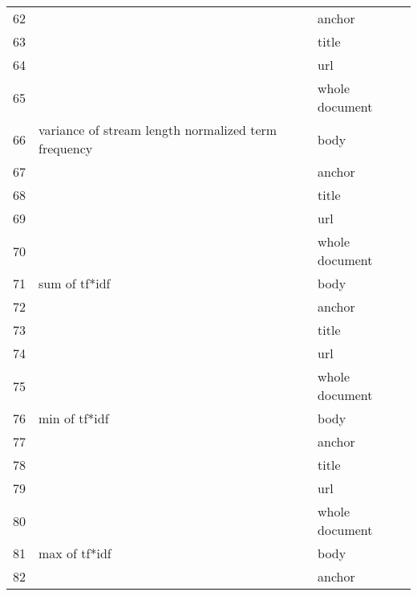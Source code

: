 \begin{longtable}{cll}
62         &                                                     & anchor         \\
63         &                                                     & title          \\
64         &                                                     & url            \\
65         &                                                     & whole document \\
\midrule66         & variance of stream length normalized term frequency & body           \\
67         &                                                     & anchor         \\
68         &                                                     & title          \\
69         &                                                     & url            \\
70         &                                                     & whole document \\
\midrule71         & sum of tf*idf                                       & body           \\
72         &                                                     & anchor         \\
73         &                                                     & title          \\
74         &                                                     & url            \\
75         &                                                     & whole document \\
\midrule76         & min of tf*idf                                       & body           \\
77         &                                                     & anchor         \\
78         &                                                     & title          \\
79         &                                                     & url            \\
80         &                                                     & whole document \\
\midrule81         & max of tf*idf                                       & body           \\
82         &                                                     & anchor         \\

\end{longtable}
